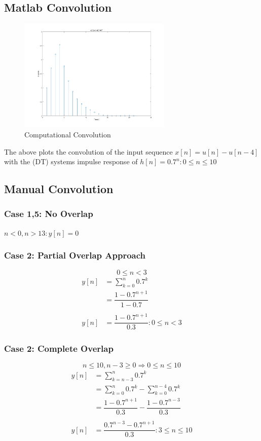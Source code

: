 \documentclass[a4paper,11pt]{article}
\begin{document}
		\subsection{Matlab Convolution}
			\begin{figure}[h]
			 \begin{center}
			  \includegraphics[width=0.65\textwidth]{3a}
			  \caption{Computational Convolution}
			 \end{center}
			\end{figure}
			The above plots the convolution of the input sequence $x[n] = u[n]-u[n-4]$ with the (DT) systems impulse response of $h[n] = 0.7^{n} : 0 \leq n \leq 10$
		
		\subsection{Manual Convolution}
			\subsubsection*{Case 1,5: No Overlap}
				$n<0, n>13 : y[n] = 0$
			\subsubsection*{Case 2: Partial Overlap Approach}
			$$0 \leq n < 3$$
			\begin{align*}
			y[n] &= \sum_{k=0}^{n} 0.7^{k} \\
			     &= \dfrac{1-0.7^{n+1}}{1-0.7} \\ \\
			y[n] &= \dfrac{1-0.7^{n+1}}{0.3} : 0 \leq n < 3
			\end{align*}
			
			\subsubsection*{Case 2: Complete Overlap}
			$$n \leq 10, n-3 \geq 0 \Rightarrow 0 \leq n \leq 10$$			
			\begin{align*}
			y[n] &= \sum_{k=n-3}^{n} 0.7^{k} \\
			     &= \sum_{k=0}^{n} 0.7^{k} - \sum_{k=0}^{n-4} 0.7^{k} \\
			     &= \dfrac{1-0.7^{n+1}}{0.3} - \dfrac{1-0.7^{n-3}}{0.3} \\ \\
			y[n] &= \dfrac{0.7^{n-3}-0.7^{n+1}}{0.3} : 3 \leq n \leq 10		
			\end{align*}
\end{document}
